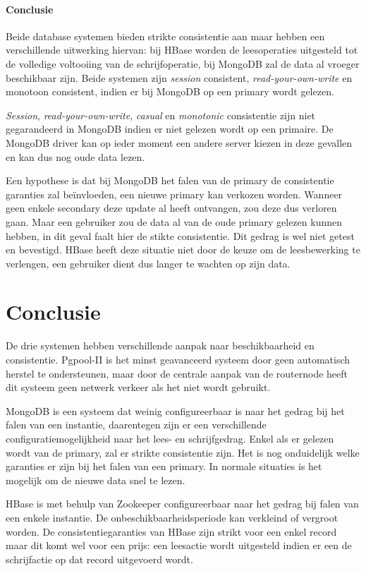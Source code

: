 \paragraph{Conclusie} Beide database systemen bieden strikte consistentie aan maar hebben een verschillende uitwerking hiervan: bij HBase worden de leesoperaties uitgesteld tot de volledige voltooiing van de schrijfoperatie, bij MongoDB zal de data al vroeger beschikbaar zijn. Beide systemen zijn \textit{session} consistent, \textit{read-your-own-write} en monotoon consistent, indien er bij MongoDB op een primary wordt gelezen.  

\textit{Session}, \textit{read-your-own-write}, \textit{casual} en \textit{monotonic} consistentie zijn niet gegarandeerd in MongoDB indien er niet gelezen wordt op een primaire. De MongoDB driver kan op ieder moment een andere server kiezen in deze gevallen en kan dus nog oude data lezen. 

Een hypothese is dat bij MongoDB het falen van de primary de consistentie garanties zal beïnvloeden, een nieuwe primary kan verkozen worden. Wanneer geen enkele secondary deze update al heeft ontvangen, zou deze dus verloren gaan. Maar een gebruiker zou de data al van de oude primary gelezen kunnen hebben, in dit geval faalt hier de stikte consistentie. Dit gedrag is wel niet getest en bevestigd. HBase heeft deze situatie niet door de keuze om de leesbewerking te verlengen, een gebruiker dient dus langer te wachten op zijn data. 

\section{Conclusie}
De drie systemen hebben verschillende aanpak naar beschikbaarheid en consistentie. Pgpool-II is het minst geavanceerd systeem door geen automatisch herstel te ondersteunen, maar door de centrale aanpak van de routernode heeft dit systeem geen netwerk verkeer als het niet wordt gebruikt. 

MongoDB is een systeem dat weinig configureerbaar is naar het gedrag bij het falen van een instantie, daarentegen zijn er een verschillende configuratiemogelijkheid naar het lees- en schrijfgedrag. Enkel als er gelezen wordt van de primary, zal er strikte consistentie zijn. Het is nog onduidelijk welke garanties er zijn bij het falen van een primary. In normale situaties is het mogelijk om de nieuwe data snel te lezen. 

HBase is met behulp van Zookeeper configureerbaar naar het gedrag bij falen van een enkele instantie. De onbeschikbaarheidsperiode kan verkleind of vergroot worden. De consistentiegaranties van HBase zijn strikt voor een enkel record maar dit komt wel voor een prijs: een leesactie wordt uitgesteld indien er een de schrijfactie op dat record uitgevoerd wordt. 